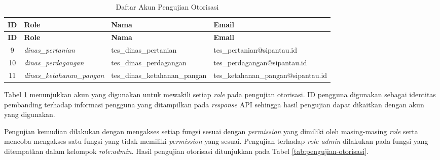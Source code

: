 \begin{longtable}{|c|p{3cm}|p{4cm}|p{4.8cm}|}
\caption{Daftar Akun Pengujian Otorisasi}
\label{tab:akun-pengujian-otorisasi} \\
\hline
\textbf{ID} & \textbf{Role} & \textbf{Nama} & \textbf{Email} \\
\hline
\endfirsthead

\hline
\textbf{ID} & \textbf{Role} & \textbf{Nama} & \textbf{Email} \\
\hline
\endhead

9 & \textit{dinas\allowbreak \_pertanian} &
tes\allowbreak \_dinas\allowbreak \_pertanian &
tes\allowbreak \_pertanian\allowbreak @sipantau.id \\ \hline

10 & \textit{dinas\allowbreak \_perdagangan} &
tes\allowbreak \_dinas\allowbreak \_perdagangan &
tes\allowbreak \_perdagangan\allowbreak @sipantau.id \\ \hline

11 & \textit{dinas\allowbreak \_ketahanan\allowbreak \_pangan} &
tes\allowbreak \_dinas\allowbreak \_ketahanan\allowbreak \_pangan &
tes\allowbreak \_ketahanan\allowbreak \_pangan\allowbreak @sipantau.id \\ \hline

\end{longtable}

Tabel \ref{tab:akun-pengujian-otorisasi} menunjukkan akun yang digunakan untuk mewakili setiap \textit{role} pada pengujian otorisasi. ID pengguna digunakan sebagai identitas pembanding terhadap informasi pengguna yang ditampilkan pada \textit{response} API sehingga hasil pengujian dapat dikaitkan dengan akun yang digunakan.

Pengujian kemudian dilakukan dengan mengakses setiap fungsi sesuai dengan \textit{permission} yang dimiliki oleh masing-masing \textit{role} serta mencoba mengakses satu fungsi yang tidak memiliki \textit{permission} yang sesuai. Pengujian terhadap \textit{role admin} dilakukan pada fungsi yang ditempatkan dalam kelompok \textit{role:admin}. Hasil pengujian otorisasi ditunjukkan pada Tabel \ref{tab:pengujian-otorisasi}.


